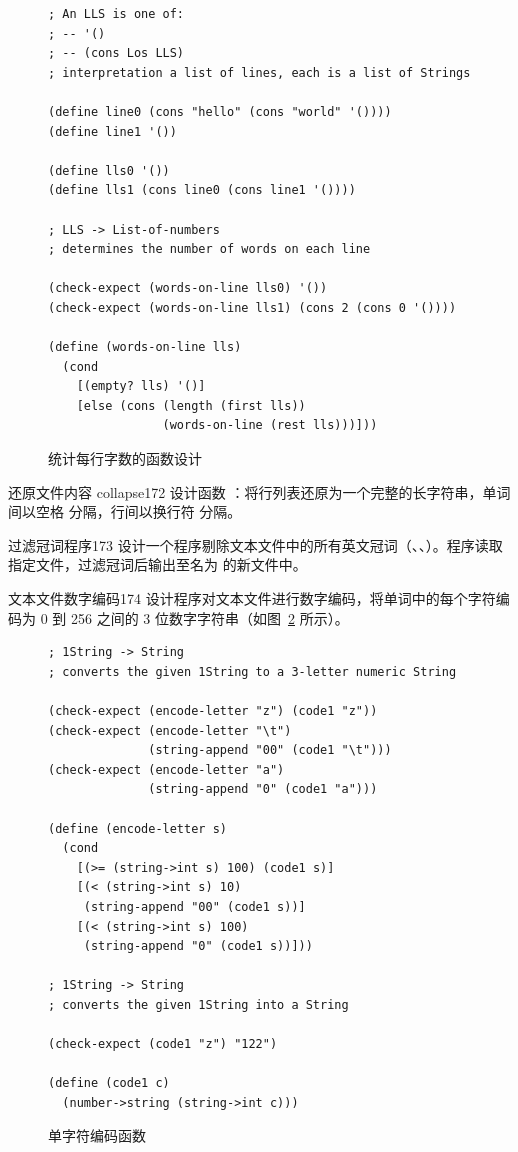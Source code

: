\begin{figure}[htbp]
  \centering
\begin{lstlisting}[language=BSL, basicstyle=\scriptsize\ttfamily]
; An LLS is one of:
; -- '()
; -- (cons Los LLS)
; interpretation a list of lines, each is a list of Strings

(define line0 (cons "hello" (cons "world" '())))
(define line1 '())

(define lls0 '())
(define lls1 (cons line0 (cons line1 '())))

; LLS -> List-of-numbers
; determines the number of words on each line

(check-expect (words-on-line lls0) '())
(check-expect (words-on-line lls1) (cons 2 (cons 0 '())))

(define (words-on-line lls)
  (cond
    [(empty? lls) '()]
    [else (cons (length (first lls))
                (words-on-line (rest lls)))]))
\end{lstlisting}
  \caption{统计每行字数的函数设计}
  \label{fig:counting_words_on_line}
\end{figure}

\begin{exercise}{还原文件内容 collapse}{172}
设计函数 ：将行列表还原为一个完整的长字符串，单词间以空格  分隔，行间以换行符  分隔。
\end{exercise}

\begin{exercise}{过滤冠词程序}{173}
设计一个程序剔除文本文件中的所有英文冠词（、、）。程序读取指定文件，过滤冠词后输出至名为  的新文件中。
\end{exercise}

\begin{exercise}{文本文件数字编码}{174}
设计程序对文本文件进行数字编码，将单词中的每个字符编码为 0 到 256 之间的 3 位数字字符串（如图~\ref{fig:encoding_strings} 所示）。
\end{exercise}

\begin{figure}[htbp]
  \centering
\begin{lstlisting}[language=BSL, basicstyle=\scriptsize\ttfamily]
; 1String -> String
; converts the given 1String to a 3-letter numeric String

(check-expect (encode-letter "z") (code1 "z"))
(check-expect (encode-letter "\t")
              (string-append "00" (code1 "\t")))
(check-expect (encode-letter "a")
              (string-append "0" (code1 "a")))

(define (encode-letter s)
  (cond
    [(>= (string->int s) 100) (code1 s)]
    [(< (string->int s) 10)
     (string-append "00" (code1 s))]
    [(< (string->int s) 100)
     (string-append "0" (code1 s))]))

; 1String -> String
; converts the given 1String into a String

(check-expect (code1 "z") "122")

(define (code1 c)
  (number->string (string->int c)))
\end{lstlisting}
  \caption{单字符编码函数}
  \label{fig:encoding_strings}
\end{figure}

